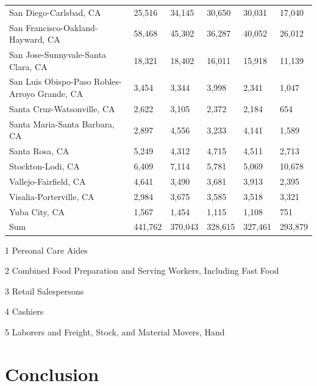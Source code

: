 \documentclass[10pt]{article}
\begin{document}
\begin{table}[H]
\begin{threeparttable}
\begin{tabular}{llllll}
San Diego-Carlsbad, CA                        & 25,516   & 34,145   & 30,650   & 30,031   & 17,040   \\
San Francisco-Oakland-Hayward, CA             & 58,468   & 45,302   & 36,287   & 40,052   & 26,012   \\
San Jose-Sunnyvale-Santa Clara, CA            & 18,321   & 18,402   & 16,011   & 15,918   & 11,139   \\
San Luis Obispo-Paso Robles-Arroyo Grande, CA & 3,454    & 3,344    & 3,998    & 2,341    & 1,047    \\
Santa Cruz-Watsonville, CA                    & 2,622    & 3,105    & 2,372    & 2,184    & 654      \\
Santa Maria-Santa Barbara, CA                 & 2,897    & 4,556    & 3,233    & 4,141    & 1,589    \\
Santa Rosa, CA                                & 5,249    & 4,312    & 4,715    & 4,511    & 2,713    \\
Stockton-Lodi, CA                             & 6,409    & 7,114    & 5,781    & 5,069    & 10,678   \\
Vallejo-Fairfield, CA                         & 4,641    & 3,490    & 3,681    & 3,913    & 2,395    \\
Visalia-Porterville, CA                       & 2,984    & 3,675    & 3,585    & 3,518    & 3,321    \\
Yuba City, CA                                 & 1,567    & 1,454    & 1,115    & 1,108    & 751      \\
\hline
Sum                                           & 441,762  & 370,043  & 328,615  & 327,461  & 293,879
\end{tabular}
\begin{tablenotes}
    \item[1] Personal Care Aides
    \item[2] Combined Food Preparation and Serving Workers, Including Fast Food
    \item[3] Retail Salespersons
    \item[4] Cashiers
    \item[5] Laborers and Freight, Stock, and Material Movers, Hand
\end{tablenotes}
\end{threeparttable}
\label{table:1}
\end{table}

\section{Conclusion}
\end{document}
